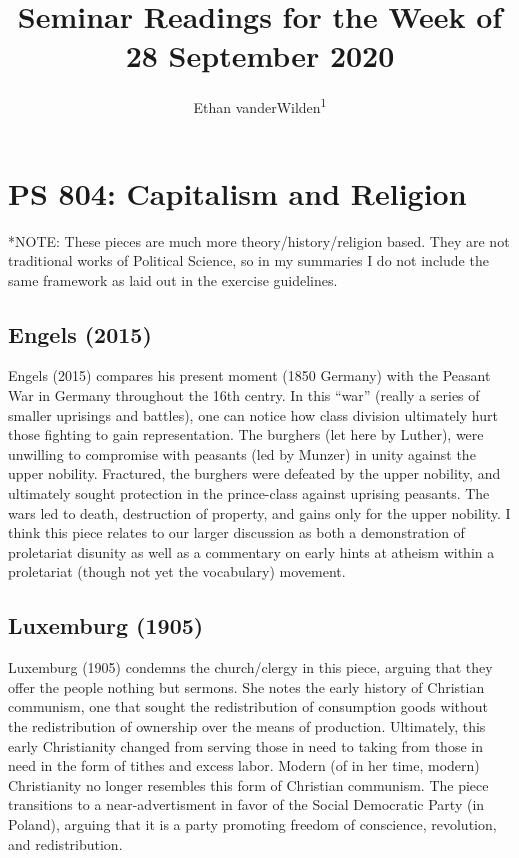 \documentclass[
  english,
  man]{apa6}
\title{Seminar Readings for the Week of 28 September 2020}
\author{Ethan vanderWilden\textsuperscript{1}}
\date{}
\affiliation{\vspace{0.5cm}\textsuperscript{1} University of Wisconsin-Madison, Department of Political Science}
\begin{document}
\maketitle

\hypertarget{ps-804-capitalism-and-religion}{%
\section{PS 804: Capitalism and Religion}\label{ps-804-capitalism-and-religion}}

*NOTE: These pieces are much more theory/history/religion based. They are not traditional works of Political Science, so in my summaries I do not include the same framework as laid out in the exercise guidelines.

\hypertarget{engelspeasantwargermany2015}{%
\subsection{Engels (2015)}\label{engelspeasantwargermany2015}}

Engels (2015) compares his present moment (1850 Germany) with the Peasant War in Germany throughout the 16th centry. In this \enquote{war} (really a series of smaller uprisings and battles), one can notice how class division ultimately hurt those fighting to gain representation. The burghers (let here by Luther), were unwilling to compromise with peasants (led by Munzer) in unity against the upper nobility. Fractured, the burghers were defeated by the upper nobility, and ultimately sought protection in the prince-class against uprising peasants. The wars led to death, destruction of property, and gains only for the upper nobility. I think this piece relates to our larger discussion as both a demonstration of proletariat disunity as well as a commentary on early hints at atheism within a proletariat (though not yet the vocabulary) movement.

\hypertarget{luxemburgsocialismchurches1905}{%
\subsection{Luxemburg (1905)}\label{luxemburgsocialismchurches1905}}

Luxemburg (1905) condemns the church/clergy in this piece, arguing that they offer the people nothing but sermons. She notes the early history of Christian communism, one that sought the redistribution of consumption goods without the redistribution of ownership over the means of production. Ultimately, this early Christianity changed from serving those in need to taking from those in need in the form of tithes and excess labor. Modern (of in her time, modern) Christianity no longer resembles this form of Christian communism. The piece transitions to a near-advertisment in favor of the Social Democratic Party (in Poland), arguing that it is a party promoting freedom of conscience, revolution, and redistribution.
\end{document}
